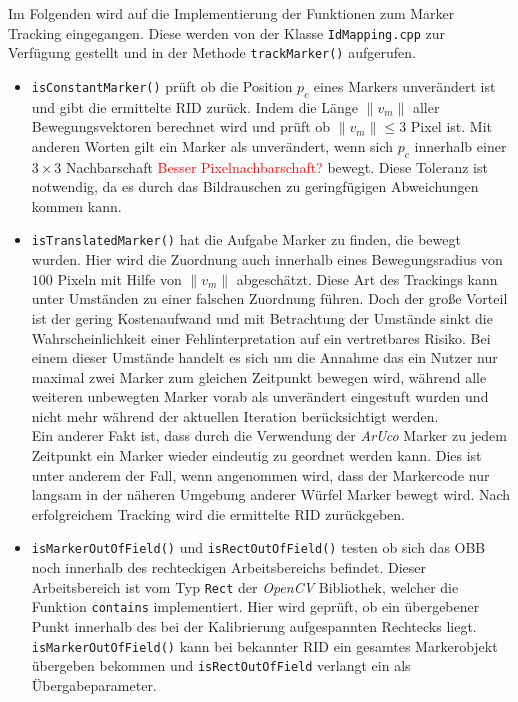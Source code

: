 Im Folgenden wird auf die Implementierung der Funktionen zum Marker Tracking eingegangen. Diese werden von der Klasse \texttt{IdMapping.cpp} zur Verfügung gestellt und in der Methode \texttt{track\-Marker()} aufgerufen.
\begin{itemize}
\item \texttt{is\-Constant\-Marker()} prüft ob die Position $p_c$ eines Markers unverändert ist und gibt die ermittelte RID zurück. Indem die Länge $\|v_m\|$ aller Bewegungsvektoren berechnet wird und prüft ob $\|v_m\|\le 3$ Pixel ist. Mit anderen Worten gilt ein Marker als unverändert, wenn sich $p_c$ innerhalb einer $3 \times 3$ Nachbarschaft \textcolor{red}{Besser Pixelnachbarschaft?} bewegt. Diese Toleranz ist notwendig, da es durch das Bildrauschen zu geringfügigen Abweichungen kommen kann.
\item \texttt{is\-Translated\-Marker()} hat die Aufgabe Marker zu finden, die bewegt wurden. Hier wird die Zuordnung auch innerhalb eines Bewegungsradius von $100$ Pixeln mit Hilfe von $\|v_m\|$  abgeschätzt. Diese Art des Trackings kann unter Umständen zu einer falschen Zuordnung führen. Doch der große Vorteil ist der gering Kostenaufwand und mit Betrachtung der Umstände sinkt die Wahrscheinlichkeit einer Fehlinterpretation auf ein vertretbares Risiko. Bei einem dieser Umstände handelt es sich um die Annahme das ein Nutzer nur maximal zwei Marker zum gleichen Zeitpunkt bewegen wird, während alle weiteren unbewegten Marker vorab als unverändert eingestuft wurden und nicht mehr während der aktuellen Iteration berücksichtigt werden.\\
Ein anderer Fakt ist, dass durch die Verwendung der \textit{ArUco} Marker zu jedem Zeitpunkt ein Marker wieder eindeutig zu geordnet werden kann. Dies ist unter anderem der Fall, wenn angenommen wird, dass der Markercode nur langsam in der näheren Umgebung anderer Würfel Marker bewegt wird. Nach erfolgreichem Tracking wird die ermittelte RID zurückgeben.
\item \texttt{isMarker\-Out\-OfField()} und \texttt{is\-Rect\-Out\-Of\-Field()} testen ob sich das OBB noch innerhalb des rechteckigen Arbeitsbereichs befindet. Dieser Arbeitsbereich ist vom Typ \texttt{Rect} der \textit{OpenCV} Bibliothek, welcher die Funktion \texttt{contains} implementiert. Hier wird geprüft, ob ein übergebener Punkt innerhalb des bei der Kalibrierung aufgespannten Rechtecks liegt. \texttt{isMarker\-OutOf\-Field()} kann bei bekannter RID ein gesamtes Markerobjekt übergeben bekommen und \texttt{isRectOutOfField} verlangt ein  als Übergabeparameter.

\end{itemize}

